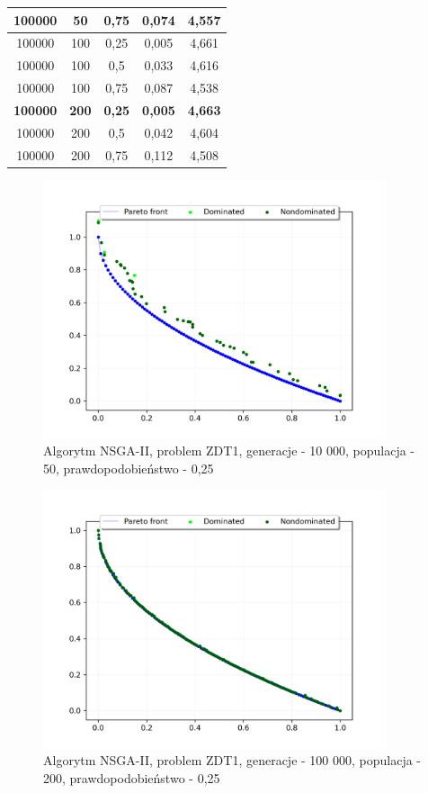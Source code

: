 \documentclass{classrep}
\begin{document}
\begin{table}[H]
\begin{tabular}{|ccc|c|c|}
100000 & 50 & 0,75 & 0,074 & 4,557 \\ \hline
100000 & 100 & 0,25 & 0,005 & 4,661 \\ \hline
100000 & 100 & 0,5 & 0,033 & 4,616 \\ \hline
100000 & 100 & 0,75 & 0,087 & 4,538 \\ \hline
\textbf{100000} & \textbf{200} & \textbf{0,25} & \textbf{0,005} & \textbf{4,663} \\ \hline
100000 & 200 & 0,5 & 0,042 & 4,604 \\ \hline
100000 & 200 & 0,75 & 0,112 & 4,508 \\ \hline
\end{tabular}
\end{table}

\begin{figure}[H]
    \centering
    \includegraphics[width=0.9\textwidth]{img2/NSGAII_ZDT1_g10000_p50_r0,25.png}
    \caption{Algorytm NSGA-II, problem ZDT1, \newline generacje - 10 000, populacja - 50, prawdopodobieństwo - 0,25}
\end{figure}

\begin{figure}[H]
    \centering
    \includegraphics[width=0.9\textwidth]{img2/NSGAII_ZDT1_g100000_p200_r0,25.png}
    \caption{Algorytm NSGA-II, problem ZDT1, \newline generacje - 100 000, populacja - 200, prawdopodobieństwo - 0,25}
\end{figure}
\end{document}
